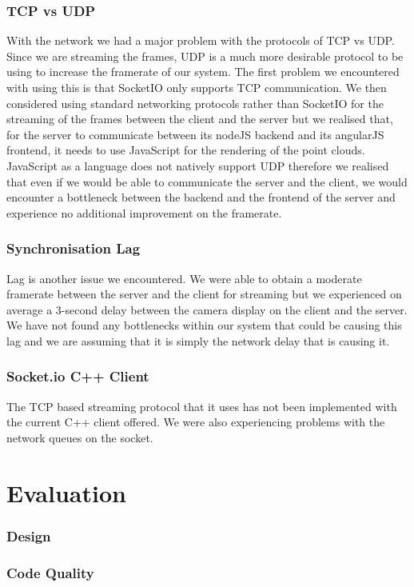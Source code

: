 \documentclass{article}
\begin{document}
\subsubsection{TCP vs UDP}
With the network we had a major problem with the protocols of TCP vs UDP. Since we are streaming the frames, UDP is a much more desirable protocol to be using to increase the framerate of our system. The first problem we encountered with using this is that SocketIO only supports TCP communication. We then considered using standard networking protocols rather than SocketIO for the streaming of the frames between the client and the server but we realised that, for the server to communicate between its nodeJS backend and its angularJS frontend, it needs to use JavaScript for the rendering of the point clouds. JavaScript as a language does not natively support UDP therefore we realised that even if we would be able to communicate the server and the client, we would encounter a bottleneck between the backend and the frontend of the server and experience no additional improvement on the framerate.
\subsubsection{Synchronisation Lag}
Lag is another issue we encountered. We were able to obtain a moderate framerate between the server and the client for streaming but we experienced on average a 3-second delay between the camera display on the client and the server. We have not found any bottlenecks within our system that could be causing this lag and we are assuming that it is simply the network delay that is causing it.
\newpage
\subsubsection{Socket.io C++ Client}
The TCP based streaming protocol that it uses has not been implemented with the current C++ client offered.
We were also experiencing problems with the network queues on the socket.
\newpage
\section{Evaluation}
\subsubsection{Design}
\subsubsection{Code Quality}
\end{document}
